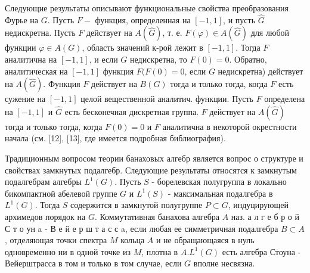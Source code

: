 \documentclass[10pt]{article}
\begin{document}
Следующие результаты описывают функциональные свойства преобразования Фурье на $G$. Пусть $F-$ функция, определенная на $[-1,1]$, и пусть $\hat{G}$ недискретна. Пусть $F$ действует на $A(\hat{G})$, т. е. $F(\varphi) \in A(\hat{G})$ для любой функции $\varphi \in A(G)$, область значений к-рой лежит в $[-1,1]$. Тогда $F$ аналитична на $[-1,1]$, и если $G$ недискретна, то $F(0)=0$. Обратно, аналитическая на $[-1,1]$ функция $F(F(0)=0$, если $G$ недискретна) действует на $A(\widehat{G})$. Функция $F$ действует на $B(G)$ тогда и только тогда, когда $F$ есть сужение на $[-1,1]$ целой вещественной аналитич. функции. Пусть $F$ определена на $[-1,1]$ и $\hat{G}$ есть бесконечная дискретная группа. $F$ действует на $A(\widehat{G})$ тогда и только тогда, когда $F(0)=0$ и $F$ аналитична в некоторой окрестности начала (см. [12], [13], где имеется подробная библиография).



Традиционным вопросом теории банаховых алгебр является вопрос о структуре и свойствах замкнутых подалгебр. Следующие результаты относятся к замкнутым подалгебрам алгебры $L^{1}(G)$. Пусть $S$ - борелевская полугруппа в локально бикомпактной абелевой группе $G$ и $L^{1}(S)$ - максимальная подалгебра в $L^{1}(G)$. Тогда $S$ содержится в замкнутой полугруппе $P \subset G$, индуцирующей архимедов порядок на $G$. Коммутативная банахова алгебра $A$ наз. а л г е б р о й С т о ун a - В е й е р ш т а с с a, если любая ее симметричная подалгебра $B \subset A$, отделяющая точки спектра $M$ кольца $A$ и не обращающаяся в нуль одновременно ни в одной точке из $M$, плотна в $A . L^{1}(G)$ есть алгебра Стоуна - Вейерштрасса в том и только в том случае, если $G$ вполне несвязна.
\end{document}
